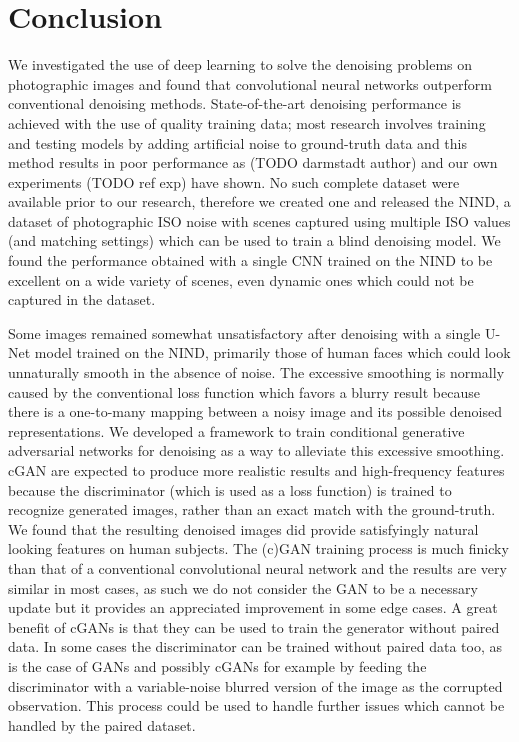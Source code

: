 \chapter{Conclusion}

We investigated the use of deep learning to solve the denoising problems on photographic images and found that convolutional neural networks outperform conventional denoising methods. State-of-the-art denoising performance is achieved with the use of quality training data; most research involves training and testing models by adding artificial noise to ground-truth data and this method results in poor performance as (TODO darmstadt author) \cite{darmstadt} and our own experiments (TODO ref exp) have shown. No such complete dataset were available prior to our research, therefore we created one and released the \acf{NIND}, a dataset of photographic ISO noise with scenes captured using multiple ISO values (and matching settings) which can be used to train a blind denoising model. We found the performance obtained with a single \acl{CNN} trained on the \ac{NIND} to be excellent on a wide variety of scenes, even dynamic ones which could not be captured in the dataset.

Some images remained somewhat unsatisfactory after denoising with a single U-Net model trained on the \ac{NIND}, primarily those of human faces which could look unnaturally smooth in the absence of noise. The excessive smoothing is normally caused by the conventional loss function which favors a blurry result because there is a one-to-many mapping between a noisy image and its possible denoised representations. We developed a framework to train conditional generative adversarial networks for denoising as a way to alleviate this excessive smoothing. \ac{cGAN} are expected to produce more realistic results and high-frequency features because the discriminator (which is used as a loss function) is trained to recognize generated images, rather than an exact match with the ground-truth. We found that the resulting denoised images did provide satisfyingly natural looking features on human subjects. The (c)\ac{GAN} training process is much finicky than that of a conventional convolutional neural network and the results are very similar in most cases, as such we do not consider the \ac{GAN} to be a necessary update but it provides an appreciated improvement in some edge cases. A great benefit of \acp{cGAN} is that they can be used to train the generator without paired data. In some cases the discriminator can be trained without paired data too, as is the case of \acp{GAN} and possibly \acp{cGAN} for example by feeding the discriminator with a variable-noise blurred version of the image as the corrupted observation. This process could be used to handle further issues which cannot be handled by the paired dataset.

